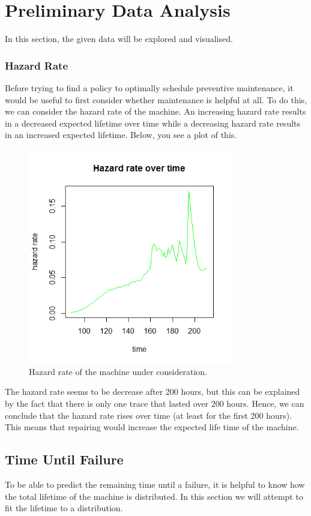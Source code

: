 \section{Preliminary Data Analysis}
In this section, the given data will be explored and visualised.

\subsubsection{Hazard Rate}
Before trying to find a policy to optimally schedule preventive maintenance, it would be useful to first consider whether maintenance is helpful at all. To do this, we can consider the hazard rate of the machine. An increasing hazard rate results in a decreased expected lifetime over time while a decreasing hazard rate results in an increased expected lifetime. Below, you see a plot of this.
\begin{figure}[H]
\centering
\includegraphics[width=0.8\textwidth]{Plots/HazardRate.png}
\caption{Hazard rate of the machine under consideration.}
\end{figure}
The hazard rate seems to be decrease after 200 hours, but this can be explained by the fact that there is only one trace that lasted over 200 hours. Hence, we can conclude that the hazard rate rises over time (at least for the first 200 hours). This means that repairing would increase the expected life time of the machine.

\subsection{Time Until Failure}
To be able to predict the remaining time until a failure, it is helpful to know how the total lifetime of the machine is distributed. In this section we will attempt to fit the lifetime to a distribution.

